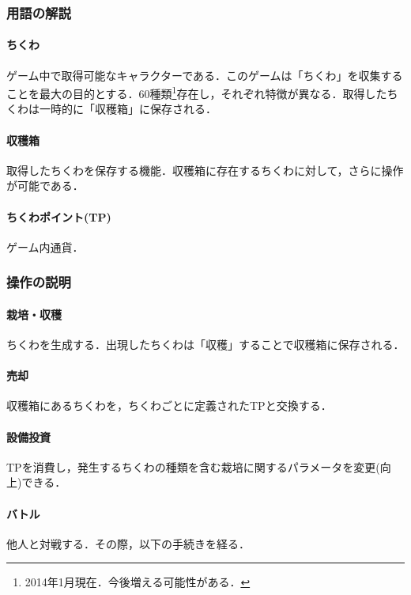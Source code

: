 \documentclass[a4paper,11pt]{jsarticle}
\begin{document}
\subsubsection{用語の解説}
\paragraph{ちくわ}
ゲーム中で取得可能なキャラクターである．このゲームは「ちくわ」を収集することを最大の目的とする．60種類\footnote{2014年1月現在．今後増える可能性がある．}存在し，それぞれ特徴が異なる．取得したちくわは一時的に「収穫箱」に保存される．

\paragraph{収穫箱}
取得したちくわを保存する機能．収穫箱に存在するちくわに対して，さらに操作が可能である．

\paragraph{ちくわポイント(TP)}
ゲーム内通貨．

\subsubsection{操作の説明}
\paragraph{栽培・収穫}
ちくわを生成する．出現したちくわは「収穫」することで収穫箱に保存される．

\paragraph{売却}
収穫箱にあるちくわを，ちくわごとに定義されたTPと交換する．

\paragraph{設備投資}
TPを消費し，発生するちくわの種類を含む栽培に関するパラメータを変更(向上)できる．

\paragraph{バトル}
他人と対戦する．その際，以下の手続きを経る．
\end{document}
